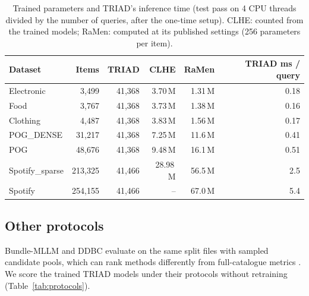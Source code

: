 \documentclass[runningheads]{llncs}
\begin{document}
\begin{table}[t]
\centering
\caption{Trained parameters and TRIAD's inference time (test pass on 4 CPU threads divided by the number of
queries, after the one-time setup). CLHE: counted from the trained models; RaMen: computed at its published settings
(256 parameters per item).}
\label{tab:size}
\setlength{\tabcolsep}{4pt}
\scriptsize
\begin{tabular}{lrrrrr}
\toprule
Dataset & Items & TRIAD & CLHE & RaMen & TRIAD ms / query\\
\midrule
Electronic & 3,499 & 41,368 & 3.70\,M & 1.31\,M & 0.18\\
Food & 3,767 & 41,368 & 3.73\,M & 1.38\,M & 0.16\\
Clothing & 4,487 & 41,368 & 3.83\,M & 1.56\,M & 0.17\\
POG\_DENSE & 31,217 & 41,368 & 7.25\,M & 11.6\,M & 0.41\\
POG & 48,676 & 41,368 & 9.48\,M & 16.1\,M & 0.51\\
Spotify\_sparse & 213,325 & 41,466 & 28.98\,M & 56.5\,M & 2.5\\
Spotify & 254,155 & 41,466 & -- & 67.0\,M & 5.4\\
\bottomrule
\end{tabular}
\end{table}

\subsection{Other protocols}
\label{sec:protocols}

Bundle-MLLM \cite{bundlemllm} and DDBC \cite{ddbc} evaluate on the same split files with sampled candidate pools, which can rank methods differently from full-catalogue
metrics \cite{krichene2020}.
We score the trained TRIAD models under their protocols without retraining (Table~\ref{tab:protocols}).
\end{document}

